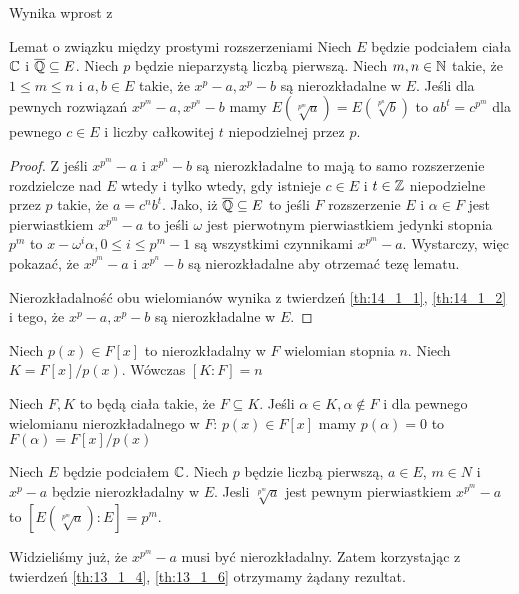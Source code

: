   Wynika wprost z \cite[Twierdzenie 14.1.2]{rom06}

\begin{lemma}{Lemat o związku między prostymi rozszerzeniami}
  Niech $E$ będzie podciałem ciała $\mathbb{C}$ i $\overline{\mathbb{Q}} \subseteq E$.
  Niech $p$ będzie nieparzystą liczbą pierwszą.
  Niech $m, n \in \mathbb{N}$ takie, że $1 \leq m \leq n$ i $a, b \in E$ takie, że $x^p
  - a, x^p - b$ są nierozkładalne w $E$.
  Jeśli dla pewnych rozwiązań $x^{p^m} - a, x^{p^n} -b$ mamy
  $E\left(\sqrt[p^m]{a}\right) = E\left(\sqrt[p^n]{b}\right)$ to $ab^t =
  c^{p^m}$ dla pewnego $c \in E$ i liczby całkowitej $t$ niepodzielnej przez
  $p$.
  \label{lem:associated_extensions}
\end{lemma}
\begin{proof}
  Z \cite[Twierdzenie 14.2.8]{rom06} jeśli $x^{p^m} - a$ i $x^{p^n} - b$ są
  nierozkładalne to mają to samo rozszerzenie rozdzielcze nad $E$ wtedy i tylko
  wtedy, gdy istnieje $c \in E$ i $t \in \mathbb{Z}$ niepodzielne przez $p$ takie, że
  $a = c^nb^t$.
  Jako, iż $\overline{\mathbb{Q}} \subseteq E$ to jeśli $F$ rozszerzenie $E$ i $\alpha
  \in F$  jest pierwiastkiem $x^{p^m} -a$ to jeśli $\omega$ jest pierwotnym
  pierwiastkiem jedynki stopnia $p^m$ to $x - \omega^i \alpha, 0 \leq i \leq p^m
  - 1$ są wszystkimi czynnikami $x^{p^m} - a$.
  Wystarczy, więc pokazać, że $x^{p^m} - a$ i $x^{p^n} - b$ są nierozkładalne
  aby otrzemać tezę lematu.

  Nierozkładalność obu wielomianów wynika z twierdzeń \ref{th:14_1_1},
  \ref{th:14_1_2} i tego, że $x^p -a, x^p - b$ są nierozkładalne w $E$.
\end{proof}

\begin{theorem}
  Niech $p(x) \in F[x]$ to nierozkładalny w $F$ wielomian stopnia $n$.
  Niech $K = F[x]/p(x)$. Wówczas $[K:F] = n$
  \label{th:13_1_6}
\end{theorem}

  \cite[Twierdzenie 13.1.6]{dum04}

\begin{theorem}
  Niech $F, K$ to będą ciała takie, że $F \subseteq K$.
  Jeśli $\alpha \in K, \alpha \not \in F$ i dla pewnego wielomianu
  nierozkładalnego w $F$: $p(x) \in F[x]$ mamy $p(\alpha) = 0$ to
  $F(\alpha) = F[x]/p(x)$
  \label{th:13_1_4}
\end{theorem}

  \cite[Twierdzenie 13.1.4]{dum04}

\begin{lemma}
  Niech $E$ będzie podciałem $\mathbb{C}$. Niech $p$ będzie liczbą pierwszą, $a \in E$,
  $m \in N$ i $x^p - a$ będzie nierozkładalny w $E$.
  Jesli $\sqrt[p^m]{a}$ jest pewnym pierwiastkiem $x^{p^m} - a$ to
  $\left[E \left(\sqrt[p^m]{a} \right) : E \right] = p^m$.
  \label{lem:root_extension}
\end{lemma}

  Widzieliśmy już, że $x^{p^m} - a$ musi być nierozkładalny. Zatem korzystając z
  twierdzeń \ref{th:13_1_4}, \ref{th:13_1_6} otrzymamy żądany rezultat.
